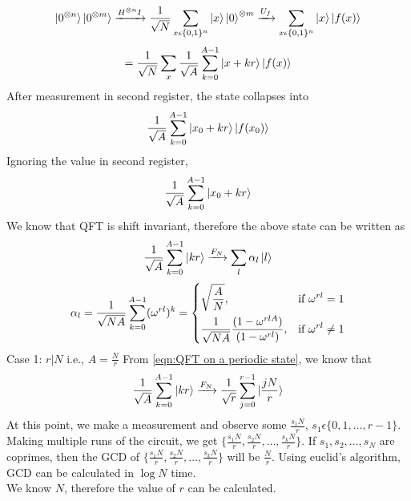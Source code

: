 \documentclass[11.5pt, paper=a4]{article}
\theoremstyle{definition}
\numberwithin{theorem}{section}
\begin{document}
\begin{equation*}
    \ket{0^{\otimes n}}\ket{0^{\otimes m}} \xrightarrow{H^{\otimes n}I} \frac{1}{\sqrt{N}}\sum_{x\epsilon\{0,1\}^n}\ket{x}\ket{0}^{\otimes m} \xrightarrow{U_f} \sum_{x\epsilon \{0,1\}^n}\ket{x}\ket{f(x)}
\end{equation*}
\begin{equation*}
    = \frac{1}{\sqrt{N}}\sum_{x}\frac{1}{\sqrt{A}}\sum_{k=0}^{A-1}\ket{x+kr}\ket{f(x)}
\end{equation*}
After measurement in second register, the state collapses into
\begin{equation*}
    \frac{1}{\sqrt{A}}\sum_{k=0}^{A-1}\ket{x_0+kr}\ket{f(x_0)}
\end{equation*}
Ignoring the value in second register,
\begin{equation*}
    \frac{1}{\sqrt{A}}\sum_{k=0}^{A-1}\ket{x_0+kr}
\end{equation*}
We know that QFT is shift invariant, therefore the above state can be written as
\begin{equation*}
    \frac{1}{\sqrt{A}}\sum_{k=0}^{A-1}\ket{kr} \xrightarrow{F_N} \sum_{l}\alpha_l\ket{l}
\end{equation*}
\begin{equation*}
    \alpha_l = \frac{1}{\sqrt{NA}}\sum_{k=0}^{A-1}(\omega^{rl})^k = \begin{dcases}
    \sqrt{\frac{A}{N}},& \text{if }\omega^{rl}=1\\
    \frac{1}{\sqrt{NA}}\frac{(1-\omega^{rlA})}{(1-\omega^{rl})},& \text{if }\omega^{rl}\neq1
    \end{dcases}
\end{equation*}
Case 1: $r\vert N$ i.e., $A=\frac{N}{r}$
From \ref{eqn:QFT on a periodic state}, we know that
\begin{equation*}
    \frac{1}{\sqrt{A}}\sum_{k=0}^{A-1}\ket{kr} \xrightarrow{F_N} \frac{1}{\sqrt{r}}\sum_{j=0}^{r-1}\ket{\frac{jN}{r}}
\end{equation*}
At this point, we make a measurement and observe some $\frac{s_1N}{r}$, $s_1\epsilon\{0,1,\dots,r-1\}$.\\
Making multiple runs of the circuit, we get $\{\frac{s_1N}{r},\frac{s_2N}{r},\dots,\frac{s_kN}{r}\}$.
If ${s_1,s_2,\dots,s_N}$ are coprimes, then the GCD of $\{\frac{s_1N}{r},\frac{s_2N}{r},\dots,\frac{s_kN}{r}\}$ will be $\frac{N}{r}$. Using euclid's algorithm, GCD can be calculated in $\log N$ time.\\
We know $N$, therefore the value of $r$ can be calculated.
\end{document}
